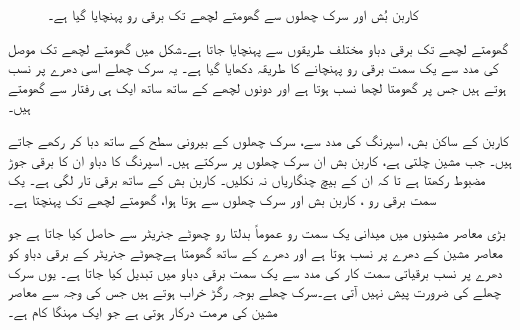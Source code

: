 \begin{figure}
%
\caption{کاربن بُش اور سرک چھلوں سے گھومتے لچھے تک برقی رو پہنچایا گیا ہے۔}
\label{شکل_معاصر_سرک_چھلے}
\end{figure}


 گھومتے لچھے تک برقی دباو مختلف طریقوں سے پہنچایا جاتا ہے۔شکل   میں گھومتے لچھے تک موصل   کی مدد سے یک سمت  برقی رو پہنچانے کا طریقہ دکھایا گیا ہے۔ یہ سرک چھلے اسی دھرے  پر نسب ہوتے ہیں جس پر گھومتا لچھا نسب ہوتا ہے اور دونوں لچھے کے ساتھ ساتھ ایک ہی رفتار سے گھومتے ہیں۔ 

کاربن کے ساکن بش، اسپرنگ  کی مدد  سے، سرک چھلوں  کے بیرونی سطح  کے ساتھ دبا کر رکھے جاتے ہیں۔ جب مشین چلتی ہے،  کاربن بش ان سرک چھلوں پر سرکتے ہیں۔ اسپرنگ کا دباو ان کا برقی جوڑ مضبوط رکھتا ہے تا کہ ان کے بیچ چنگاریاں نہ نکلیں۔ کاربن بش کے ساتھ برقی تار لگی ہے۔  یک سمت  برقی رو  ، کاربن بش اور سرک چھلوں  سے ہوتا ہوا،  گھومتے لچھے تک پہنچتا ہے۔

بڑی معاصر مشینوں میں میدانی یک سمت  رو عموماً  بدلتا رو چھوٹے جنریٹر سے حاصل کیا جاتا ہے جو معاصر مشین کے دھرے پر  نسب ہوتا ہے اور دھرے  کے ساتھ  گھومتا ہےچھوٹے جنریٹر کے برقی دباو کو دھرے پر  نسب برقیاتی سمت کار کی مدد سے یک سمت  برقی دباو میں تبدیل کیا جاتا ہے۔ یوں سرک چھلے کی ضرورت پیش نہیں آتی ہے۔سرک چھلے بوجہ  رگڑ خراب ہوتے ہیں جس کی وجہ سے معاصر مشین کی مرمت درکار ہوتی ہے جو  ایک مہنگا کام ہے۔

